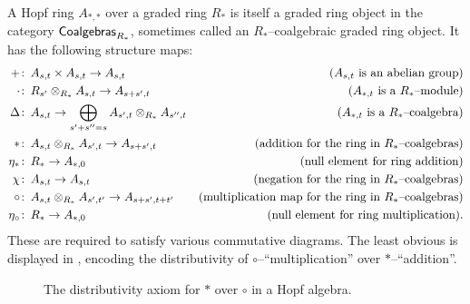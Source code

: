 \begin{definition}
A Hopf ring $A_{*, *}$ over a graded ring $R_*$ is itself a graded ring object in the category $\mathsf{Coalgebras}_{R_*}$, sometimes called an $R_*$--coalgebraic graded ring object.  It has the following structure maps:
\begin{align*}
+ & \colon\thinspace A_{s, t} \times A_{s, t} \to A_{s, t} & \text{($A_{s, t}$ is an abelian group)} \\
\cdot & \colon\thinspace R_{s'} \otimes_{R_*} A_{s, t} \to A_{s+s', t} & \text{($A_{*, t}$ is a $R_*$--module)} \\
\Delta & \colon\thinspace A_{s, t} \to \bigoplus_{s' + s'' = s} A_{s', t} \otimes_{R_*} A_{s'', t} & \text{($A_{*, t}$ is a $R_*$--coalgebra)} \\
\ast & \colon\thinspace A_{s, t} \otimes_{R_*} A_{s', t} \to A_{s + s', t} & \text{(addition for the ring in $R_*$--coalgebras)} \\
\eta_\ast & \colon\thinspace R_* \to A_{*, 0} & \text{(null element for ring addition)} \\
\chi & \colon\thinspace A_{s, t} \to A_{s, t} & \text{(negation for the ring in $R_*$--coalgebras)} \\
\circ & \colon\thinspace A_{s, t} \otimes_{R_*} A_{s', t'} \to A_{s + s', t + t'} & \text{(multiplication map for the ring in $R_*$--coalgebras)} \\
\eta_\circ & \colon\thinspace R_* \to A_{*, 0} & \text{(null element for ring multiplication)}.
\end{align*}
These are required to satisfy various commutative diagrams. The least obvious is displayed in , encoding the distributivity of $\circ$--``multiplication'' over $\ast$--``addition''.
\begin{figure}
\begin{center}
\end{center}
\caption{The distributivity axiom for $\ast$ over $\circ$ in a Hopf algebra.}\label{DistributivityDiagram}
\end{figure}
\end{definition}

